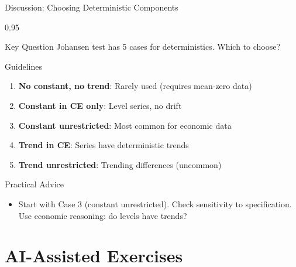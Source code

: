 \documentclass[9pt, aspectratio=169, t]{beamer}
\begin{document}
\begin{frame}{Discussion: Choosing Deterministic Components}
    \begin{cminipage}{0.95\textwidth}
    {\small
    \begin{alertblock}{Key Question}
        Johansen test has 5 cases for deterministics. Which to choose?
    \end{alertblock}
    \begin{block}{Guidelines}
        \begin{enumerate}\setlength{\itemsep}{0pt}
            \item \textbf{No constant, no trend}: Rarely used (requires mean-zero data)
            \item \textbf{Constant in CE only}: Level series, no drift
            \item \textbf{Constant unrestricted}: Most common for economic data
            \item \textbf{Trend in CE}: Series have deterministic trends
            \item \textbf{Trend unrestricted}: Trending differences (uncommon)
        \end{enumerate}
    \end{block}
    \begin{exampleblock}{Practical Advice}
        \begin{itemize}\setlength{\itemsep}{0pt}
            \item Start with Case 3 (constant unrestricted). Check sensitivity to specification. Use economic reasoning: do levels have trends?
        \end{itemize}
    \end{exampleblock}
    }
    \end{cminipage}
\end{frame}

\section{AI-Assisted Exercises}
\end{document}
